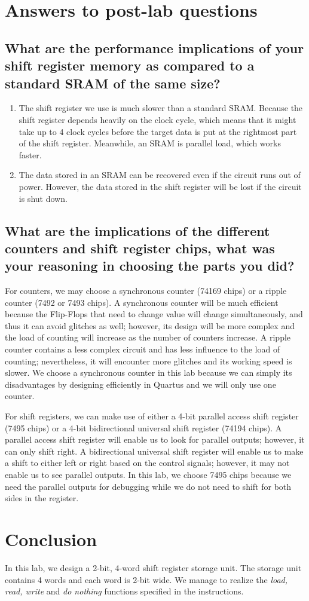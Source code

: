 \documentclass[12pt]{article}
\begin{document}
\section{Answers to post-lab questions}
\subsection{What are the performance implications of your shift register memory as compared to a standard SRAM of the same size?}
\begin{enumerate}
    \item The shift register we use is much slower than a standard SRAM. Because the shift register depends heavily on the clock cycle, which means that it might take up to 4 clock cycles before the target data is put at the rightmost part of the shift register. Meanwhile, an SRAM is parallel load, which works faster.
    \item The data stored in an SRAM can be recovered even if the circuit runs out of power. However, the data stored in the shift register will be lost if the circuit is shut down.
\end{enumerate}

\subsection{What are the implications of the different counters and shift 
register chips, what was your reasoning in choosing the parts you 
did?}
For counters, we may choose a synchronous counter (74169 chips) or a ripple counter (7492 or 7493 chips). A synchronous counter will be much efficient because the Flip-Flops that need to change value will change simultaneously, and thus it can avoid glitches as well; however, its design will be more complex and the load of counting will increase as the number of counters increase. A ripple counter contains a less complex circuit and has less influence to the load of counting; nevertheless, it will encounter more glitches and its working speed is slower. We choose a synchronous counter in this lab because we can simply its disadvantages by designing efficiently in Quartus and we will only use one counter.
 
For shift registers, we can make use of either a 4-bit parallel access shift register (7495 chips) or a 4-bit bidirectional universal shift register (74194 chips). A parallel access shift register will enable us to look for parallel outputs; however, it can only shift right. A bidirectional universal shift register will enable us to make a shift to either left or right based on the control signals; however, it may not enable us to see parallel outputs. In this lab, we choose 7495 chips because we need the parallel outputs for debugging while we do not need to shift for both sides in the register.

\section{Conclusion}
In this lab, we design a 2-bit, 4-word shift register storage unit. The storage unit contains 4 words and each word is 2-bit wide. We manage to realize the \textit{load, read, write} and \textit{do nothing} functions specified in the instructions.
\end{document}
